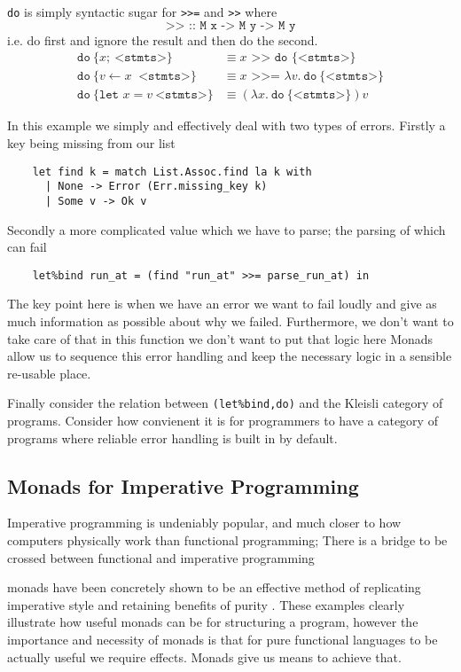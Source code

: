 \texttt{do} is simply syntactic sugar for \texttt{>>=} and \texttt{>>} where
\begin{equation}
    \texttt{>> :: M x -> M y -> M y}
\end{equation}
i.e. do first and ignore the result and then do the second.
\begin{align}
    \texttt{do}\ \{ x;\ \texttt{<stmts>} \}
    &\equiv x \texttt{ >> do \{<stmts>\}}
    \\
    \texttt{do}\ \{ v \leftarrow x\ \texttt{ <stmts>}\}
    &\equiv x \texttt{ >>= } \lambda v.\ \texttt{do}\ \{ \texttt{<stmts>} \}
    \\
    \texttt{do}\ \{\texttt{let }x = v\ \texttt{<stmts>}\}
    &\equiv (\lambda x.\ \texttt{do}\ \{ \texttt{<stmts>} \})v
\end{align}

In this example we simply and effectively deal with two types of errors.
Firstly a key being missing from our list
\begin{verbatim}
    let find k = match List.Assoc.find la k with
      | None -> Error (Err.missing_key k)
      | Some v -> Ok v
\end{verbatim}
Secondly a more complicated value which we have to parse;
the parsing of which can fail
\begin{verbatim}
    let%bind run_at = (find "run_at" >>= parse_run_at) in
\end{verbatim}
The key point here is when we have an error we want to fail
loudly and give as much information as possible about why we failed.
Furthermore, we don't want to take care of that in this function
we don't want to put that logic here
Monads allow us to sequence this error handling
and keep the necessary logic in a sensible re-usable place.

Finally consider the relation between
\texttt{(let\%bind,do)} and the Kleisli category of programs.
Consider how convienent it is for programmers to have a category
of programs where reliable error handling is built in by default.

\subsection{Monads for Imperative Programming}
Imperative programming is undeniably popular,
and much closer to how computers physically work than functional programming;
There is a bridge to be crossed between functional and imperative programming

monads have been concretely shown to be an effective method of replicating
imperative style and retaining benefits of purity \cite{PeytonJones:1993}.
These examples clearly illustrate how useful monads can be for structuring a program,
however the importance and necessity of monads is that for pure functional languages
to be actually useful we require effects. Monads give us means to achieve that.

